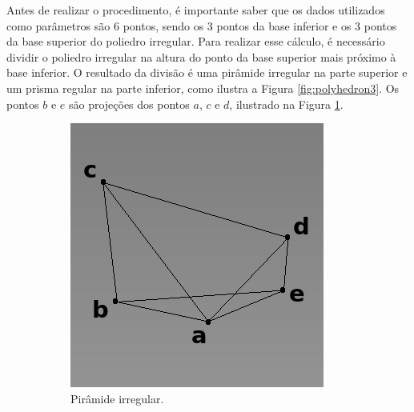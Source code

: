 Antes de realizar o procedimento, é importante saber que os dados utilizados como parâmetros são 6 pontos, sendo os 3 pontos da base inferior e os 3 pontos da base superior do poliedro irregular.
Para realizar esse cálculo, é necessário dividir o poliedro irregular na altura do ponto da base superior mais próximo à base inferior.
O resultado da divisão é uma pirâmide irregular na parte superior e um prisma regular na parte inferior, como ilustra a Figura \ref{fig:polyhedron3}.
Os pontos $b$ e $e$ são projeções dos pontos $a$, $c$ e $d$, ilustrado na Figura \ref{fig:pyramid_i}.

\begin{figure}[H]
    \centering
    \begin{subfigure}[t]{0.3\textwidth}
        \includegraphics[width=\textwidth]{dados/figuras/pyramid_line3.png}
        \caption{Pirâmide irregular.}
        \label{fig:pyramid_i}
    \end{subfigure}
    \hspace{2em}
    \begin{subfigure}[t]{0.3\textwidth}

\end{subfigure}
\end{figure}
